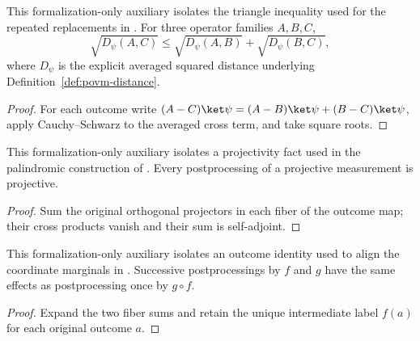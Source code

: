 \begin{lemma}
	\label{lem:sandwich-root-distance-triangle}
	\leanok
	This formalization-only auxiliary isolates the triangle inequality used for
	the repeated replacements in \cite[Fact~4.34]{Natarajan2018NEEXP}. For three operator
	families $A,B,C$,
	\[
		\sqrt{D_\psi(A,C)}
		\leq\sqrt{D_\psi(A,B)}+\sqrt{D_\psi(B,C)},
	\]
	where $D_\psi$ is the explicit averaged squared distance underlying
	Definition~\ref{def:povm-distance}.
\end{lemma}
\begin{proof}
	\leanok
	For each outcome write $(A-C)\ket\psi=(A-B)\ket\psi+(B-C)\ket\psi$,
	apply Cauchy--Schwarz to the averaged cross term, and take square roots.
\end{proof}

\begin{lemma}
	\label{lem:sandwich-postprocess-projective}
	\leanok
	This formalization-only auxiliary isolates a projectivity fact used in the
	palindromic construction of \cite[Fact~4.34]{Natarajan2018NEEXP}. Every postprocessing of a
	projective measurement is projective.
\end{lemma}
\begin{proof}
	\leanok
	Sum the original orthogonal projectors in each fiber of the outcome map;
	their cross products vanish and their sum is self-adjoint.
\end{proof}

\begin{lemma}
	\label{lem:sandwich-postprocess-compose}
	\leanok
	This formalization-only auxiliary isolates an outcome identity used to align
	the coordinate marginals in \cite[Fact~4.34]{Natarajan2018NEEXP}. Successive
	postprocessings by $f$ and $g$ have the same effects as postprocessing once
	by $g\circ f$.
\end{lemma}
\begin{proof}
	\leanok
	Expand the two fiber sums and retain the unique intermediate label $f(a)$
	for each original outcome $a$.
\end{proof}

